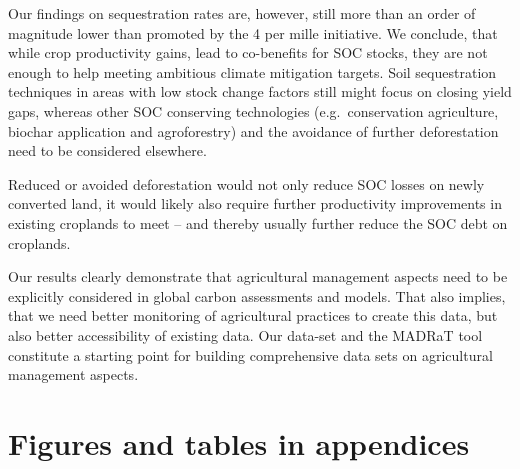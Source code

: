 \documentclass[gc, manuscript]{copernicus}
\begin{document}
Our findings on sequestration rates are, however, still more than an order of magnitude lower than promoted by the 4 per mille initiative. We conclude, that while crop productivity gains, lead to co-benefits for SOC stocks, they are not enough to help meeting ambitious climate mitigation targets. Soil sequestration techniques in areas with low stock change factors still might focus on closing yield gaps, whereas other SOC conserving technologies (e.g.~conservation agriculture, biochar application and agroforestry) and the avoidance of further deforestation need to be considered elsewhere.

Reduced or avoided deforestation would not only reduce SOC losses on newly converted land, it would likely also require further productivity improvements in existing croplands to meet -- and thereby usually further reduce the SOC debt on croplands.

Our results clearly demonstrate that agricultural management aspects need to be explicitly considered in global carbon assessments and models. That also implies, that we need better monitoring of agricultural practices to create this data, but also better accessibility of existing data. Our data-set and the MADRaT tool constitute a starting point for building comprehensive data sets on agricultural management aspects.








\appendix
\section{Figures and tables in appendices}
\end{document}
